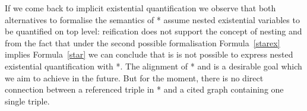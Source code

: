 If we come back to implicit existential quantification we observe that both alternatives to formalise the semantics of \rdf{}*
assume nested existential variables to be quantified on top level: reification does not support the concept of nesting and from the fact that under the second possible formalisation
Formula~\ref{starex} implies Formula~\ref{star} we can conclude that is is not possible to express nested existential quantification with \rdf{}*.
% 
The alignment of \rdf{}* and \nthree is a desirable goal which we aim to achieve in the future. But for the moment, 
there is no direct connection between a referenced triple in \rdf{}* and a cited \nthree graph containing one single triple.  
